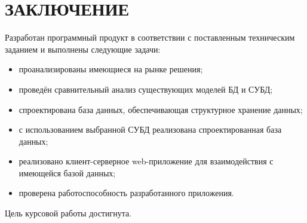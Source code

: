\chapter*{\hfill{}ЗАКЛЮЧЕНИЕ\hfill{}}%
\label{cha:zakliuchenie}

Разработан программный продукт в соответствии с поставленным техническим заданием и выполнены следующие задачи:
\begin{itemize}
    \item проанализированы имеющиеся на рынке решения;
    \item проведён сравнительный анализ существующих моделей БД и СУБД;
    \item спроектирована база данных, обеспечивающая структурное хранение данных;
    \item с использованием выбранной СУБД реализована спроектированная база данных;
    \item реализовано клиент-серверное web-приложение для взаимодействия с имеющейся базой данных;
    \item проверена работоспособность разработанного приложения.
\end{itemize}

Цель курсовой работы достигнута.
